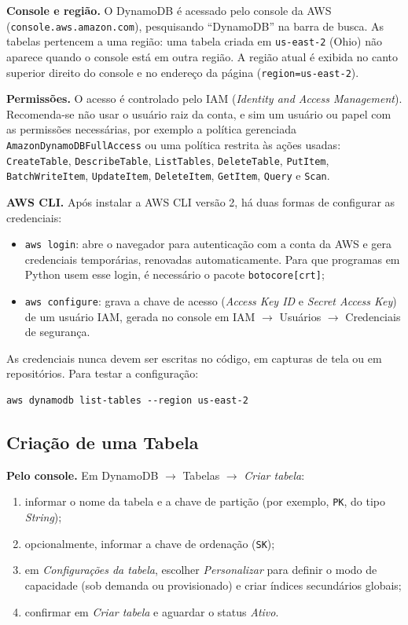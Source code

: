 \documentclass[12pt]{article}
\begin{document}
\textbf{Console e região.} O DynamoDB é acessado pelo console da AWS
(\texttt{console.aws.amazon.com}), pesquisando ``DynamoDB'' na barra de busca.
As tabelas pertencem a uma região: uma tabela criada em
\texttt{us-east-2} (Ohio) não aparece quando o console está em outra região.
A região atual é exibida no canto superior direito do console e no endereço
da página (\texttt{region=us-east-2}).

\textbf{Permissões.} O acesso é controlado pelo IAM (\textit{Identity and
Access Management}). Recomenda-se não usar o usuário raiz da conta, e sim um
usuário ou papel com as permissões necessárias, por exemplo a política
gerenciada \texttt{AmazonDynamoDBFullAccess} ou uma política restrita às
ações usadas: \texttt{CreateTable}, \texttt{DescribeTable},
\texttt{ListTables}, \texttt{DeleteTable}, \texttt{PutItem},
\texttt{BatchWriteItem}, \texttt{UpdateItem}, \texttt{DeleteItem},
\texttt{GetItem}, \texttt{Query} e \texttt{Scan}.

\textbf{AWS CLI.} Após instalar a AWS CLI versão 2, há duas formas de
configurar as credenciais:

\begin{itemize}
  \item \texttt{aws login}: abre o navegador para autenticação com a conta da
  AWS e gera credenciais temporárias, renovadas automaticamente. Para que
  programas em Python usem esse login, é necessário o pacote
  \texttt{botocore[crt]};
  \item \texttt{aws configure}: grava a chave de acesso (\textit{Access Key ID}
  e \textit{Secret Access Key}) de um usuário IAM, gerada no console em IAM
  $\rightarrow$ Usuários $\rightarrow$ Credenciais de segurança.
\end{itemize}

As credenciais nunca devem ser escritas no código, em capturas de tela ou em
repositórios. Para testar a configuração:

{\footnotesize
\begin{verbatim}
aws dynamodb list-tables --region us-east-2
\end{verbatim}
}

\subsection{Criação de uma Tabela}

\textbf{Pelo console.} Em DynamoDB $\rightarrow$ Tabelas $\rightarrow$
\textit{Criar tabela}:

\begin{enumerate}
  \item informar o nome da tabela e a chave de partição (por exemplo,
  \texttt{PK}, do tipo \textit{String});
  \item opcionalmente, informar a chave de ordenação (\texttt{SK});
  \item em \textit{Configurações da tabela}, escolher \textit{Personalizar}
  para definir o modo de capacidade (sob demanda ou provisionado) e criar
  índices secundários globais;
  \item confirmar em \textit{Criar tabela} e aguardar o status
  \textit{Ativo}.
\end{enumerate}
\end{document}
